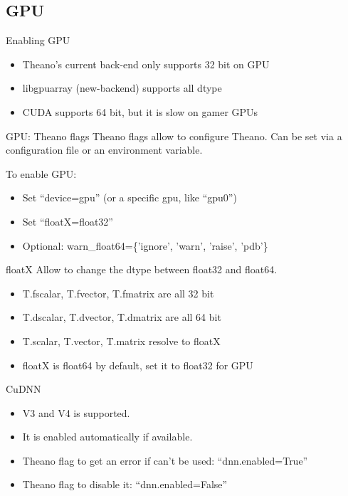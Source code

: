 \documentclass[utf8x,xcolor=pdftex,dvipsnames,table]{beamer}
\begin{document}
\subsection{GPU}
\begin{frame}{Enabling GPU}
  \begin{itemize}
  \item Theano's current back-end only supports 32 bit on GPU
  \item libgpuarray (new-backend) supports all dtype
  \item CUDA supports 64 bit, but it is slow on gamer GPUs
  \end{itemize}
\end{frame}


\begin{frame}{GPU: Theano flags}
  Theano flags allow to configure Theano. Can be set via a
  configuration file or an environment variable.

  To enable GPU:
  \begin{itemize}
  \item Set ``device=gpu'' (or a specific gpu, like ``gpu0'')
  \item Set ``floatX=float32''
  \item Optional: warn\_float64=\{'ignore', 'warn', 'raise', 'pdb'\}
  \end{itemize}
\end{frame}


\begin{frame}{floatX}
  Allow to change the dtype between float32 and float64.
  \begin{itemize}
  \item T.fscalar, T.fvector, T.fmatrix are all 32 bit
  \item T.dscalar, T.dvector, T.dmatrix are all 64 bit
  \item T.scalar, T.vector, T.matrix resolve to floatX
  \item floatX is float64 by default, set it to float32 for GPU
  \end{itemize}
\end{frame}

\begin{frame}{CuDNN}
  \begin{itemize}
  \item V3 and V4 is supported.
  \item It is enabled automatically if available.
  \item Theano flag to get an error if can't be used: ``dnn.enabled=True''
  \item Theano flag to disable it: ``dnn.enabled=False''
  \end{itemize}
\end{frame}
\end{document}
